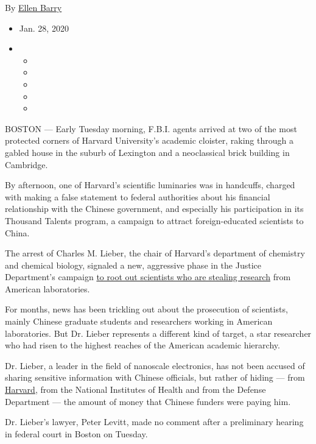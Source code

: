 By \href{https://www.nytimes3xbfgragh.onion/by/ellen-barry}{Ellen Barry}

\begin{itemize}
\item
  Jan. 28, 2020
\item
  \begin{itemize}
  \item
  \item
  \item
  \item
  \item
  \end{itemize}
\end{itemize}

BOSTON --- Early Tuesday morning, F.B.I. agents arrived at two of the
most protected corners of Harvard University's academic cloister, raking
through a gabled house in the suburb of Lexington and a neoclassical
brick building in Cambridge.

By afternoon, one of Harvard's scientific luminaries was in handcuffs,
charged with making a false statement to federal authorities about his
financial relationship with the Chinese government, and especially his
participation in its Thousand Talents program, a campaign to attract
foreign-educated scientists to China.

The arrest of Charles M. Lieber, the chair of Harvard's department of
chemistry and chemical biology, signaled a new, aggressive phase in the
Justice Department's campaign
\href{https://www.nytimes3xbfgragh.onion/2019/11/04/health/china-nih-scientists.html}{to
root out scientists who are stealing research} from American
laboratories.

For months, news has been trickling out about the prosecution of
scientists, mainly Chinese graduate students and researchers working in
American laboratories. But Dr. Lieber represents a different kind of
target, a star researcher who had risen to the highest reaches of the
American academic hierarchy.

Dr. Lieber, a leader in the field of nanoscale electronics, has not been
accused of sharing sensitive information with Chinese officials, but
rather of hiding --- from
\href{https://www.nytimes3xbfgragh.onion/2020/07/15/us/steven-pinker-harvard.html}{Harvard},
from the National Institutes of Health and from the Defense Department
--- the amount of money that Chinese funders were paying him.

Dr. Lieber's lawyer, Peter Levitt, made no comment after a preliminary
hearing in federal court in Boston on Tuesday.

